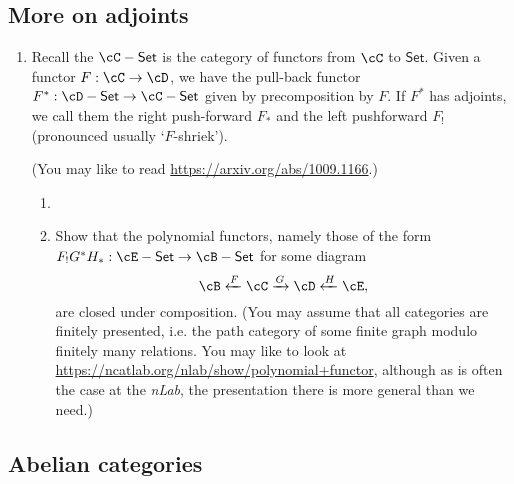 \documentclass[12pt]{amsart}
\begin{document}
\subsection{More on adjoints}
\begin{enumerate}
\item Recall the $\cC-\mathsf{Set}$ is the category of functors from $\cC$ to $\mathsf{Set}$. Given a functor $F : \cC \to \cD$, we have the pull-back functor $F^* : \cD-\mathsf{Set} \to \cC-\mathsf{Set}$ given by precomposition by $F$. If $F^*$ has adjoints, we call them the right push-forward $F_*$ and the left pushforward $F_!$ (pronounced usually `$F$-shriek').

(You may like to read \url{https://arxiv.org/abs/1009.1166}.)
\begin{enumerate}
	\item {}
	\item Show that the polynomial functors, namely those of the form $F_! G^* H_* : \cE-\mathsf{Set} \to \cB-\mathsf{Set}$ for some diagram $$\cB \xleftarrow{F} \cC \xrightarrow{G} \cD \xleftarrow{H} \cE,$$ are closed under composition. (You may assume that all categories are finitely presented, i.e. the path category of some finite graph modulo finitely many relations. You may like to look at \url{https://ncatlab.org/nlab/show/polynomial+functor}, although as is often the case at the \emph{nLab}, the presentation there is more general than we need.) 
\end{enumerate}

\end{enumerate}

\subsection{Abelian categories}
\end{document}
